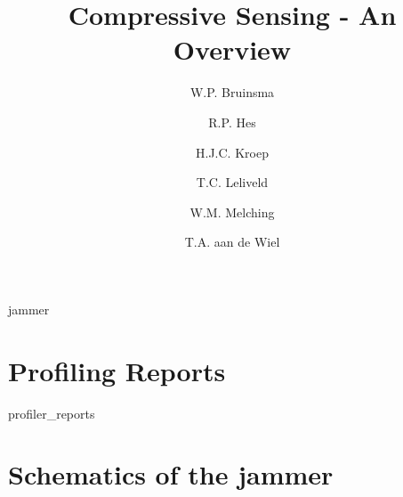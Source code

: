 \documentclass[a4paper, openany, oneside]{memoir}
\title{Compressive Sensing - An Overview}
\author{W.P. Bruinsma \and R.P. Hes \and H.J.C. Kroep \and T.C. Leliveld \and W.M. Melching \and T.A. aan de Wiel}
\begin{document}
\appendix

{jammer}

\chapter{Profiling Reports}
\label{ap:prof}
{profiler_reports}

\chapter{Schematics of the jammer}
\label{ap:jammer}

\end{document}

